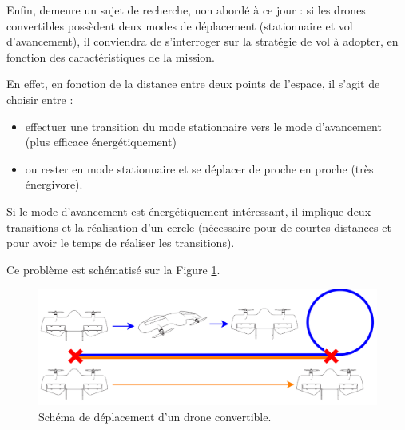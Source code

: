 Enfin, demeure un sujet de recherche, non abordé à ce jour : si les drones convertibles possèdent deux modes de déplacement (stationnaire et vol d'avancement), il conviendra de s'interroger sur la stratégie de vol à adopter, en fonction des caractéristiques de la mission.

En effet, en fonction de la distance entre deux points de l'espace, il s'agit de choisir entre :
\begin{itemize}
    \item effectuer une transition du mode stationnaire vers le mode d'avancement (plus efficace énergétiquement)
    \item ou rester en mode stationnaire et se déplacer de proche en proche (très énergivore).
\end{itemize}

Si le mode d'avancement est énergétiquement intéressant, il implique deux transitions et la réalisation d'un cercle (nécessaire pour de courtes distances et pour avoir le temps de réaliser les transitions).

Ce problème est schématisé sur la Figure \ref{fig:pbhybride}.



\begin{figure}[ht!]
    \centerline{
    \includegraphics[trim=0cm 0cm 0cm 0cm,clip,width=0.8\columnwidth]{figures/DroneConvertibleGuidage.png}}
    \caption{Schéma de déplacement d'un drone convertible.}
    \label{fig:pbhybride}
\end{figure}


